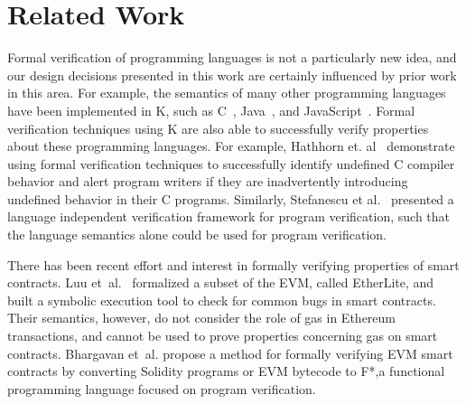\section{Related Work}
Formal verification of programming languages is not a particularly new idea,
and our design decisions presented in this work are certainly influenced by
prior work in this area. For example, the semantics of many other programming
languages have been implemented in K, such as
C~\cite{ellison-2012-thesis}, Java~\cite{bogdanas-rosu-2015-popl},
and JavaScript~\cite{park-stefanescu-rosu-2015-pldi}. Formal verification
techniques using K are also able to successfully verify properties about these
programming languages. For example, Hathhorn et.
al~\cite{hathhorn-ellison-rosu-2015-pldi} demonstrate using formal verification
techniques to successfully identify undefined C compiler behavior and alert
program writers if they are inadvertently introducing undefined behavior in
their C programs. Similarly, Stefanescu et al.~\cite{stefanescu-park-yuwen-li-rosu-2016-oopsla} presented a language independent verification framework for program verification, such that the language semantics alone could be used for program verification.

There has been recent effort and interest in formally verifying properties of
smart contracts. Luu et~al.~\cite{luumaking} formalized a subset of the EVM,
called EtherLite, and built a symbolic execution tool to check for common bugs
in smart contracts. Their semantics, however, do not consider the role of gas in
Ethereum transactions, and cannot be used to prove properties concerning gas on
smart contracts. Bhargavan et~al.\cite{evmf*} propose a method for formally
verifying EVM smart contracts by converting Solidity programs or EVM bytecode to
F*,a functional programming language focused on program verification.
